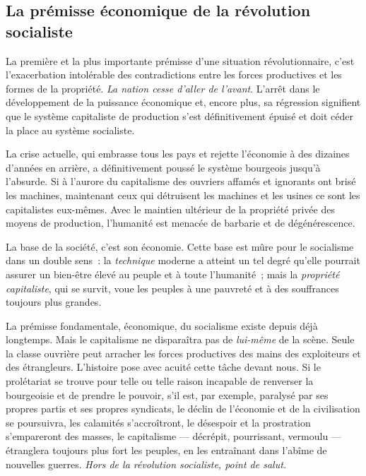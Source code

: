 \documentclass[french,twoside]{book} %
\begin{document}
\subsection[{La prémisse économique de la révolution socialiste}]{La prémisse économique de la révolution socialiste}
\noindent La première et la plus importante prémisse d’une situation révolutionnaire, c’est l’exacerbation intolérable des contradictions entre les forces productives et les formes de la propriété. \emph{La nation cesse d’aller de l’avant}. L’arrêt dans le développement de la puissance économique et, encore plus, sa régression signifient que le système capitaliste de production s’est définitivement épuisé et doit céder la place au système socialiste.\par
 La crise actuelle, qui embrasse tous les pays et rejette l’économie à des dizaines d’années en arrière, a définitivement poussé le système bourgeois jusqu’à l’absurde. Si à l’aurore du capitalisme des ouvriers affamés et ignorants ont brisé les machines, maintenant ceux qui détruisent les machines et les usines ce sont les capitalistes eux-mêmes. Avec le maintien ultérieur de la propriété privée des moyens de production, l’humanité est menacée de barbarie et de dégénérescence.\par
La base de la société, c’est son économie. Cette base est mûre pour le socialisme dans un double sens : la \emph{technique} moderne a atteint un tel degré qu’elle pourrait assurer un bien-être élevé au peuple et à toute l’humanité ; mais la \emph{propriété capitaliste}, qui se survit, voue les peuples à une pauvreté et à des souffrances toujours plus grandes.\par
La prémisse fondamentale, économique, du socialisme existe depuis déjà longtemps. Mais le capitalisme ne disparaîtra pas de \emph{lui-même} de la scène. Seule la classe ouvrière peut arracher les forces productives des mains des exploiteurs et des étrangleurs. L’histoire pose avec acuité cette tâche devant nous. Si le prolétariat se trouve pour telle ou telle raison incapable de renverser la bourgeoisie et de prendre le pouvoir, s’il est, par exemple, paralysé par ses propres partis et ses propres syndicats, le déclin de l’économie et de la civilisation se poursuivra, les calamités s’accroîtront, le désespoir et la prostration s’empareront des masses, le capitalisme — décrépit, pourrissant, vermoulu — étranglera toujours plus fort les peuples, en les entraînant dans l’abîme de nouvelles guerres. \emph{Hors de la révolution socialiste, point de salut.}
\end{document}

